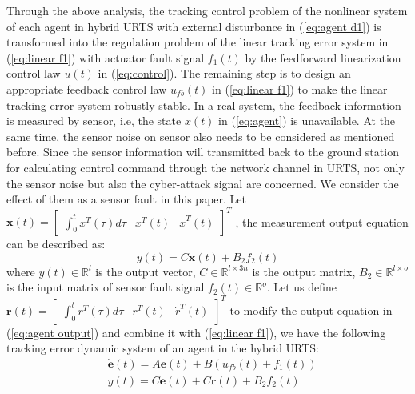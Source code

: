 \documentclass{ieeeaccess}
\begin{document}
Through the above analysis, the tracking control problem of the nonlinear system of each agent in hybrid URTS with external disturbance in (\ref{eq:agent d1}) is transformed into the regulation problem of the linear tracking error system in (\ref{eq:linear f1}) with actuator fault signal $f_1(t)$ by the feedforward linearization control law $u(t)$ in (\ref{eq:control}). The remaining step is to design an appropriate feedback control law $u_{fb}(t)$ in (\ref{eq:linear f1}) to make the linear tracking error system robustly stable. In a real system, the feedback information is measured by sensor, i.e, the state $x(t)$ in (\ref{eq:agent}) is unavailable. At the same time, the sensor noise on sensor also needs to be considered as mentioned before. Since the sensor information will transmitted back to the ground station for calculating control command through the network channel in URTS, not only the sensor noise but also the cyber-attack signal are concerned. We consider the effect of them as a sensor fault in this paper. Let $\pmb{x}(t)=\begin{bmatrix}
    \int_{0}^{t}x^T(\tau)d\tau & x^T(t) & \dot{x}^T(t)
\end{bmatrix}^T$
, the measurement output equation can be described as:
\begin{equation} \label{eq:agent output}
    y(t) = C\pmb{x}(t) + B_2f_2(t)
\end{equation}
where $y(t)\in\mathbb{R}^{l}$ is the output vector, $C\in\mathbb{R}^{l\times 3n}$ is the output matrix, $B_2\in\mathbb{R}^{l\times o}$ is the input matrix of sensor fault signal $f_2(t)\in\mathbb{R}^o$. Let us define $\pmb{r}(t)=\begin{bmatrix}
    \int_{0}^{t}r^T(\tau)d\tau & r^T(t) & \dot{r}^T(t)
\end{bmatrix}^T$ to modify the output equation in (\ref{eq:agent output}) and combine it with (\ref{eq:linear f1}), we have the following tracking error dynamic system of an agent in the hybrid URTS:
\begin{equation} \label{eq:error}
    \begin{split}
        & \dot{\pmb{e}}(t)=A\pmb{e}(t)+B(u_{fb}(t)+f_1(t)) \\
        & y(t) = C\pmb{e}(t) + C\pmb{r}(t) + B_2f_2(t)   
    \end{split}  
\end{equation}
\end{document}
